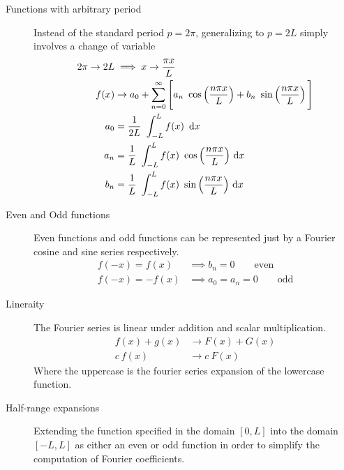 \begin{description}
    \item[Functions with arbitrary period] Instead of the standard period $ p = 2\pi $,
        generalizing to $ p = 2L $ simply involves a change of variable
        \begin{align}
            2\pi \rightarrow 2L & \implies x \rightarrow \frac{\pi x}{L}    \\
            f(x)                & \rightarrow a_0 + \iser[n]{0} \Bigg[
                a_n\ \cos\left( \frac{n\pi x}{L} \right) +
            b_n\ \sin\left( \frac{n\pi x}{L} \right) \Bigg]                 \\
            a_0                 & = \frac{1}{2L}\ \int_{-L}^{L} f(x)\ \dl x \\
            a_n                 & = \frac{1}{L}\ \int_{-L}^{L}
            f(x)\ \cos\left( \frac{n\pi x}{L} \right) \dl x                 \\
            b_n                 & = \frac{1}{L}\ \int_{-L}^{L}
            f(x)\ \sin\left( \frac{n\pi x}{L} \right) \dl x
        \end{align}

    \item[Even and Odd functions] Even functions and odd functions can be
        represented just by a Fourier cosine and sine series respectively.
        \begin{align}
            f(-x) = f(x)  & \implies b_n = 0 \qquad \text{even}      \\
            f(-x) = -f(x) & \implies a_0 = a_n = 0 \qquad \text{odd}
        \end{align}

    \item[Lineraity] The Fourier series is linear under addition and scalar
        multiplication.
        \begin{align}
            f(x) + g(x) & \rightarrow F(x) + G(x) \\
            c\ f(x)     & \rightarrow c\ F(x)
        \end{align}
        Where the uppercase is the fourier series expansion of the lowercase function.

    \item[Half-range expansions] Extending the function specified in the domain
        $ [0, L] $ into the domain $ [-L, L] $ as either an even or odd function in order
        to simplify the computation of Fourier coefficients.
\end{description}

